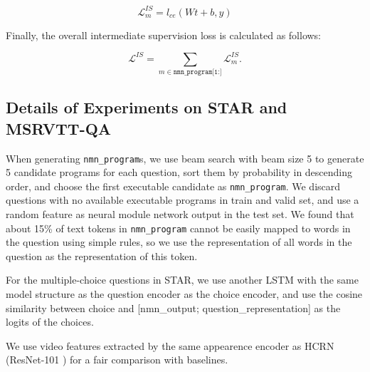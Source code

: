 \documentclass[letterpaper]{article} %
\begin{document}
\begin{equation}
\mathcal{L}_m^{IS} = l_{ce}(Wt+b, y)
\end{equation}

Finally, the overall intermediate supervision loss is calculated as follows:

\begin{equation}
\mathcal{L}^{IS}=\sum_{m \in \texttt{nmn\_program[1:]}} \mathcal{L}_m^{IS}.
\end{equation}

\subsection{Details of Experiments on STAR and MSRVTT-QA}
When generating \texttt{nmn\_program}s, we use beam search with beam size 5 to generate 5 candidate programs for each question, sort them by probability in descending order, and choose the first executable candidate as \texttt{nmn\_program}. We discard questions with no available executable programs in train and valid set, and use a random feature as neural module network output in the test set. We found that about 15\% of text tokens in \texttt{nmn\_program} cannot be easily mapped to words in the question using simple rules, so we use the representation of all words in the question as the representation of this token.

For the multiple-choice questions in STAR, we use another LSTM with the same model structure as the question encoder as the choice encoder, and use the cosine similarity between choice and [nmn\_output; question\_representation] as the logits of the choices.

We use video features extracted by the same appearence encoder as HCRN \cite{Le2020HierarchicalCR} (ResNet-101 \cite{He2015DeepRL}) for a fair comparison with baselines.

\medskip
\end{document}
